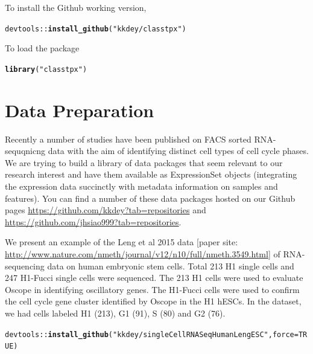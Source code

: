\documentclass[12pt]{article}\usepackage[]{graphicx}\usepackage[usenames,dvipsnames]{color}
\makeatletter
\newcommand{\hlnum}[1]{\textcolor[rgb]{0.686,0.059,0.569}{#1}}%
\newcommand{\hlstr}[1]{\textcolor[rgb]{0.192,0.494,0.8}{#1}}%
\newcommand{\hlopt}[1]{\textcolor[rgb]{0,0,0}{#1}}%
\newcommand{\hlstd}[1]{\textcolor[rgb]{0.345,0.345,0.345}{#1}}%
\newcommand{\hlkwc}[1]{\textcolor[rgb]{0.333,0.667,0.333}{#1}}%
\newcommand{\hlkwd}[1]{\textcolor[rgb]{0.737,0.353,0.396}{\textbf{#1}}}%
\newenvironment{kframe}{%
 \def\at@end@of@kframe{}%
 \ifinner\ifhmode%
  \def\at@end@of@kframe{\end{minipage}}%
  \begin{minipage}{\columnwidth}%
 \fi\fi%
 \def\FrameCommand##1{\hskip\@totalleftmargin \hskip-\fboxsep
 \colorbox{shadecolor}{##1}\hskip-\fboxsep
     \hskip-\linewidth \hskip-\@totalleftmargin \hskip\columnwidth}%
 \MakeFramed {\advance\hsize-\width
   \@totalleftmargin\z@ \linewidth\hsize
   \@setminipage}}%
 {\par\unskip\endMakeFramed%
 \at@end@of@kframe}
\newenvironment{knitrout}{}{} %
\makeatother
\begin{document}
To install the Github working version,

\begin{knitrout}
\color{fgcolor}\begin{kframe}
\begin{alltt}
\hlstd{devtools}\hlopt{::}\hlkwd{install_github}\hlstd{(}\hlstr{"kkdey/classtpx"}\hlstd{)}
\end{alltt}
\end{kframe}
\end{knitrout}

To load the package

\begin{knitrout}
\color{fgcolor}\begin{kframe}
\begin{alltt}
\hlkwd{library}\hlstd{(}\hlstr{"classtpx"}\hlstd{)}
\end{alltt}
\end{kframe}
\end{knitrout}



\section{Data Preparation}

Recently a number of studies have been published on FACS sorted RNA-sequqnicng data with the aim of identifying distinct cell types of cell cycle phases. We are trying to build a library of data packages that seem relevant to our research interest and have them available as ExpressionSet objects (integrating the expression data succinctly with metadata information on samples and features). You can find a number of these data packages hosted on our Github pages \url{https://github.com/kkdey?tab=repositories} and \url{https://github.com/jhsiao999?tab=repositories}.

We present an example of the Leng et al 2015 data [paper site: \url{http://www.nature.com/nmeth/journal/v12/n10/full/nmeth.3549.html}] of RNA-sequencing data on human embryonic stem cells. Total 213 H1 single cells and 247 H1-Fucci single cells were sequenced. The 213 H1 cells were used to evaluate Oscope in identifying oscillatory genes. The H1-Fucci cells were used to confirm the cell cycle gene cluster identified by Oscope in the H1 hESCs. In the dataset, we had cells labeled H1 (213), G1 (91), S (80) and G2 (76).


\begin{knitrout}
\color{fgcolor}\begin{kframe}
\begin{alltt}
\hlstd{devtools}\hlopt{::}\hlkwd{install_github}\hlstd{(}\hlstr{"kkdey/singleCellRNASeqHumanLengESC"}\hlstd{,} \hlkwc{force}\hlstd{=}\hlnum{TRUE}\hlstd{)}
\end{alltt}
\end{kframe}
\end{knitrout}
\end{document}
